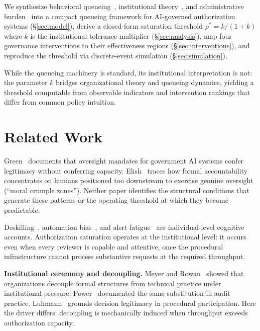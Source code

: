 \documentclass[runningheads]{llncs}
\begin{document}
We synthesize behavioral queueing~\cite{delasay2016,kcterwiesch2009},
institutional theory~\cite{meyer1977}, and administrative burden~\cite{herd2018}
into a compact queueing framework for AI-governed authorization systems
(\S\ref{sec:model}), derive a closed-form saturation threshold
$\rho^* = k/(1+k)$ where $k$ is the institutional tolerance multiplier
(\S\ref{sec:analysis}), map four governance interventions to their effectiveness
regions (\S\ref{sec:interventions}), and reproduce the threshold via discrete-event
simulation (\S\ref{sec:simulation}).

While the queueing machinery is standard, its institutional interpretation is not:
the parameter $k$ bridges organizational theory and queueing dynamics, yielding a
threshold computable from observable indicators and intervention rankings that differ
from common policy intuition.

\section{Related Work}
\label{sec:related}

Green~\cite{green2022} documents that oversight mandates for government AI systems
confer legitimacy without conferring capacity. Elish~\cite{elish2019} traces how
formal accountability concentrates on humans positioned too downstream to exercise
genuine oversight (``moral crumple zones''). Neither paper identifies the
structural conditions that generate these patterns or the operating threshold at
which they become predictable.

Deskilling~\cite{bainbridge1983}, automation bias~\cite{parasuraman1997}, and alert
fatigue~\cite{ancker2017} are individual-level cognitive accounts. Authorization
saturation operates at the institutional level: it occurs even when every reviewer
is capable and attentive, once the procedural infrastructure cannot process
substantive requests at the required throughput.

\noindent\textbf{Institutional ceremony and decoupling.}
Meyer and Rowan~\cite{meyer1977} showed that organizations decouple formal structures
from technical practice under institutional pressure; Power~\cite{power1997}
documented the same substitution in audit practice. Luhmann~\cite{luhmann1969}
grounds decision legitimacy in procedural participation. Here the driver differs:
decoupling is mechanically induced when throughput exceeds authorization capacity.
\end{document}
